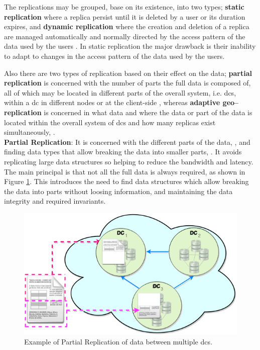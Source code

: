 \documentclass[12pt,twoside]{article}
\begin{document}
The replications may be grouped, base on its existence, into two types; {\bf static replication} where a replica persist until it is deleted by a user or its duration expires, and {\bf dynamic replication} where the creation and deletion of a replica are managed automatically and normally directed by the access pattern of the data used by the users \cite{Dong2008a}. In static replication the major drawback is their inability to adapt to changes in the access pattern of the data used by the users.

Also there are two types of replication based on their effect on the data; {\bf partial replication} is concerned with the number of parts the full data is composed of, all of which may be located in different parts of the overall system, i.e. \glspl{dc}, within a \gls{dc} in different nodes or at the client-side \cite{Briquemont2015a, Briquemont2014a, Serrano2007a}, whereas {\bf adaptive geo--replication} is concerned in what data and where the data or part of the data is located within the overall system of \glspl{dc} and how many replicas exist simultaneously, \cite{Jeon2014a, KingsyGrace2013a, Wang2012a, Abad2011a, Abdul-Wahid2007a, Loukopoulos2004a}.\\


{\bf Partial Replication}: 
It is concerned with the different parts of the data, \cite{Briquemont2014a, Serrano2007a}, and finding data types that allow breaking the data into smaller parts, \cite{Briquemont2015a}. It avoids replicating large data structures so helping to reduce the bandwidth and latency. The main principal is that not all the full data is always required, as shown in Figure \ref{fig:partial_replication}. This introduces the need to find data structures which allow breaking the data into parts without loosing information, and maintaining the data integrity and required invariants.
\begin{figure}[ht!]
	\centering
	\includegraphics[width=.6\textwidth]{figures/partialReplication.png}

	\caption{Example of Partial Replication of data between multiple \glspl{dc}.}
	\label{fig:partial_replication}
\end{figure}
\end{document}
